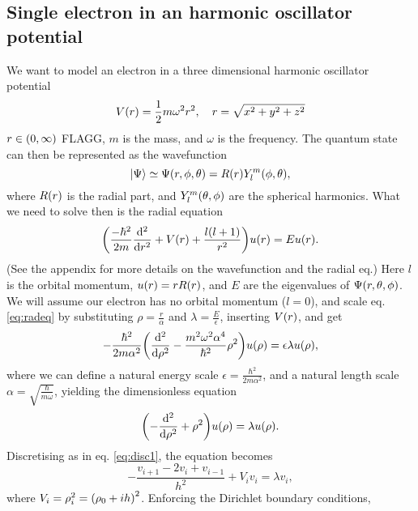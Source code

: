 \subsection{Single electron in an harmonic oscillator potential}
\label{sec:qmdot}

We want to model an electron in a three dimensional harmonic oscillator potential
  \begin{equation}
    V\qty(r) = \frac{1}{2}m\omega^2r^2, \quad r=\sqrt{x^2 + y^2 + z^2}
  \end{equation}
$r \in \qty(0, \infty)$ FLAGG, $m$ is the mass, and $\omega$ is the frequency.
The quantum state can then be represented as the wavefunction
\begin{equation}
  \ket{\Psi} \simeq \Psi\qty(r, \phi, \theta) = R\qty(r)Y_{l}^m\qty(\phi, \theta),
\end{equation}
where $R\qty(r)$ is the radial part, and $Y_{l}^m\qty(\theta, \phi)$ are the spherical
harmonics. What we need to solve then is the radial equation
\begin{equation}
  \label{eq:radeq}
  \qty(\frac{-\hbar^2}{2m}\dv[2]{}{r} + V\qty(r) + \frac{l\qty(l+1)}{r^2})u\qty(r) = Eu\qty(r).
\end{equation}
(See the appendix for more details on the wavefunction and the radial eq.) Here $l$ is the orbital momentum, $u\qty(r) = rR\qty(r)$, and $E$ are the
eigenvalues of $\Psi\qty(r, \theta, \phi)$.
We will assume our electron has no orbital momentum ($l = 0$), and scale eq. \ref{eq:radeq}
by substituting $\rho = \frac{r}{\alpha}$ and $\lambda = \frac{E}{\epsilon}$, inserting $V\qty(r)$, and get
  \begin{equation}
    -\frac{\hbar^2}{2m\alpha^2}\qty(\dv[2]{}{\rho} - \frac{m^2\omega^2 \alpha^4}{\hbar^2} \rho^2)u\qty(\rho) = \epsilon\lambda u\qty(\rho),
  \end{equation}
where we can define a natural energy scale $\epsilon = \frac{\hbar^2}{2m\alpha^2}$,
and a natural length scale $\alpha = \sqrt{\frac{\hbar}{m\omega}}$, yielding the
dimensionless equation
  \begin{equation}
    \qty(-\dv[2]{}{\rho} + \rho^2)u\qty(\rho) = \lambda u\qty(\rho).
  \end{equation}
Discretising as in eq. \ref{eq:disc1}, the equation becomes
  \begin{equation}
  \label{eq:disc2}
    -\frac{v_{i+1} - 2v_i + v_{i-1}}{h^2} + V_i v_i = \lambda v_i,
  \end{equation}
where $V_i = \rho_{i}^2=\qty(\rho_0 + ih)^2$. Enforcing the Dirichlet boundary conditions,

